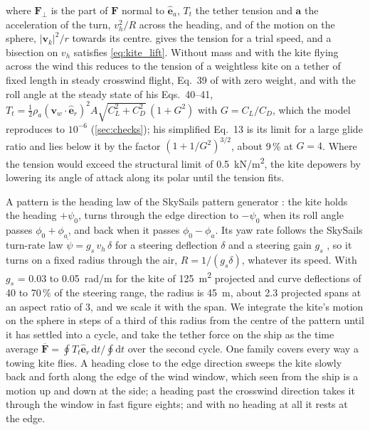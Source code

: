 where $\mathbf F_\perp$ is the part of $\mathbf F$ normal to $\hat{\mathbf e}_a$, $T_t$ the tether tension and $\mathbf a$ the acceleration of the turn, $v_h^2/R$ across the heading, and of the motion on the sphere, $|\mathbf v_k|^2/r$ towards its centre.  gives the tension for a trial speed, and a bisection on $v_h$ satisfies \cref{eq:kite_lift}. Without mass and with the kite flying across the wind this reduces to the tension of a weightless kite on a tether of fixed length in steady crosswind flight, Eq.~39 of \citet{loyd1980} with zero weight, and with the roll angle at the steady state of his Eqs.~40--41, $T_t = \tfrac12\rho_a (\mathbf v_w\cdot\hat{\mathbf e}_r)^2 A \sqrt{C_L^2+C_D^2}\,(1+G^2)$ with $G=C_L/C_D$, which the model reproduces to $10^{-6}$ (\cref{sec:checks}); his simplified Eq.~13 is its limit for a large glide ratio and lies below it by the factor $(1+1/G^2)^{3/2}$, about 9\,\% at $G=4$. Where the tension would exceed the structural limit of \SI{0.5}{kN/m^2}, the kite depowers by lowering its angle of attack along its polar until the tension fits.

A pattern is the heading law of the SkySails pattern generator \citep[Sec.~VIII]{erhard2013}: the kite holds the heading $+\psi_0$, turns through the edge direction to $-\psi_0$ when its roll angle passes $\phi_0+\phi_a$, and back when it passes $\phi_0-\phi_a$. Its yaw rate follows the SkySails turn-rate law $\dot\psi = g_s\,v_h\,\delta$ for a steering deflection $\delta$ and a steering gain $g_s$ \citep[Eq.~7]{erhard2013}, so it turns on a fixed radius through the air, $R = 1/(g_s\delta)$, whatever its speed. With $g_s$ = 0.03 to \SI{0.05}{rad/m} for the kite of \SI{125}{m^2} projected and curve deflections of 40 to 70\,\% of the steering range, the radius is \SI{45}{m}, about 2.3 projected spans at an aspect ratio of 3, and we scale it with the span. We integrate the kite's motion on the sphere in steps of a third of this radius from the centre of the pattern until it has settled into a cycle, and take the tether force on the ship as the time average $\overline{\mathbf F} = \oint T_t\hat{\mathbf e}_r\,\mathrm dt / \oint \mathrm dt$ over the second cycle. One family covers every way a towing kite flies. A heading close to the edge direction sweeps the kite slowly back and forth along the edge of the wind window, which seen from the ship is a motion up and down at the side; a heading past the crosswind direction takes it through the window in fast figure eights; and with no heading at all it rests at the edge.

